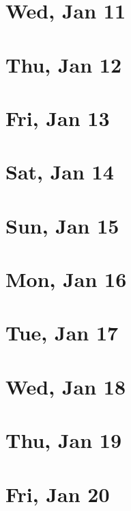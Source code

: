 	\section{Wed, Jan 11}
		
	\section{Thu, Jan 12}
		
	\section{Fri, Jan 13}
		
	\section{Sat, Jan 14}
		
	\section{Sun, Jan 15}
		
	\section{Mon, Jan 16}
		
	\section{Tue, Jan 17}
		
	\section{Wed, Jan 18}
		
	\section{Thu, Jan 19}
		
	\section{Fri, Jan 20}
		
